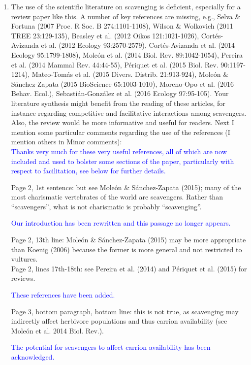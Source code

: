 \documentclass[12pt,letterpaper]{article}
\begin{document}
\begin{enumerate}
\item{The use of the scientific literature on scavenging is deficient, especially for a review paper like this. A number of key references are missing, e.g., Selva \& Fortuna (2007 Proc. R Soc. B 274:1101-1108), Wilson \& Wolkovich (2011 TREE 23:129-135), Beasley et al. (2012 Oikos 121:1021-1026), Cort\'{e}s-Avizanda et al. (2012 Ecology 93:2570-2579), Cort\'{e}s-Avizanda et al. (2014 Ecology 95:1799-1808), Mole\'{o}n et al. (2014 Biol. Rev. 89:1042-1054), Pereira et al. (2014 Mammal Rev. 44:44-55), P\'{e}riquet et al. (2015 Biol. Rev. 90:1197-1214), Mateo-Tom\'{a}s et al. (2015 Divers. Distrib. 21:913-924), Mole\'{o}n \& S\'{a}nchez-Zapata (2015 BioScience 65:1003-1010), Moreno-Opo et al. (2016 Behav. Ecol.), Sebasti\'{a}n-Gonz\'{a}lez et al. (2016 Ecology 97:95-105). Your literature synthesis might benefit from the reading of these articles, for instance regarding competitive and facilitative interactions among scavengers. Also, the review would be more informative and useful for readers. Next I mention some particular comments regarding the use of the references (I mention others in Minor comments):}\\

\textcolor{blue}{Thanks very much for these very useful references, all of which are now included and used to bolster some sections of the paper, particularly with respect to facilitation, see below for further details.}

Page 2, 1st sentence: but see Mole\'{o}n \& S\'{a}nchez-Zapata (2015); many of the most charismatic vertebrates of the world are scavengers. Rather than ``scavengers'', what is not charismatic is probably ``scavenging''.

\textcolor{blue}{Our introduction has been rewritten and this passage no longer appears.}

 Page 2, 13th line: Mole\'{o}n \& S\'{a}nchez-Zapata (2015) may be more appropriate than Koenig (2006) because the former is more general and not restricted to vultures.\\
 Page 2, lines 17th-18th: see Pereira et al. (2014) and P\'{e}riquet et al. (2015) for reviews.

\textcolor{blue}{These references have been added.}

 Page 3, bottom paragraph, bottom line: this is not true, as scavenging may indirectly affect herbivore populations and thus carrion availability (see Mole\'{o}n et al. 2014 Biol. Rev.).

\textcolor{blue}{The potential for scavengers to affect carrion availability has been acknowledged.}


\end{enumerate}
\end{document}
